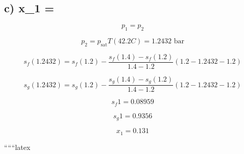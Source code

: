 \subsection*{c) x_1 = }

\[
p_1 = p_2
\]

\[
p_2 = p_{\text{sat}} T(42.2 C) = 1.2432 \text{ bar}
\]

\[
s_f (1.2432) = s_f (1.2) - \frac{s_f (1.4) - s_f (1.2)}{1.4 - 1.2} (1.2 - 1.2432 - 1.2)
\]

\[
s_g (1.2432) = s_g (1.2) - \frac{s_g (1.4) - s_g (1.2)}{1.4 - 1.2} (1.2 - 1.2432 - 1.2)
\]

\[
s_f 1 = 0.08959
\]

\[
s_g 1 = 0.9356
\]

\[
x_1 = 0.131
\]

``````latex